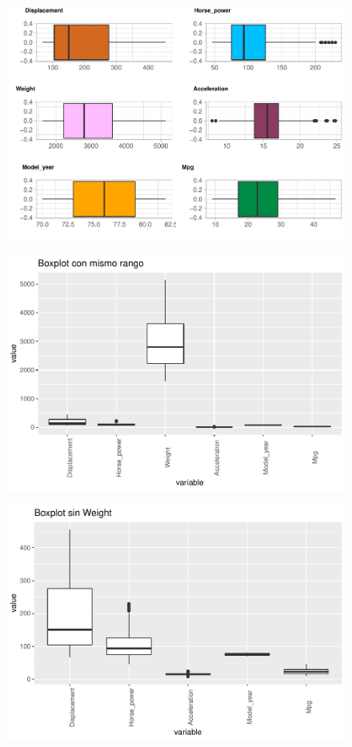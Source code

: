 \begin{figure}[H]\includegraphics[width=.9\linewidth]{img/EDA_files/figure-latex/unnamed-chunk-8-7} \caption{}\end{figure}
\begin{figure}[H]\includegraphics[width=.9\linewidth]{img/EDA_files/figure-latex/unnamed-chunk-9-1} \caption{}\end{figure}
\begin{figure}[H]\includegraphics[width=.9\linewidth]{img/EDA_files/figure-latex/unnamed-chunk-9-2} \caption{}\end{figure}

